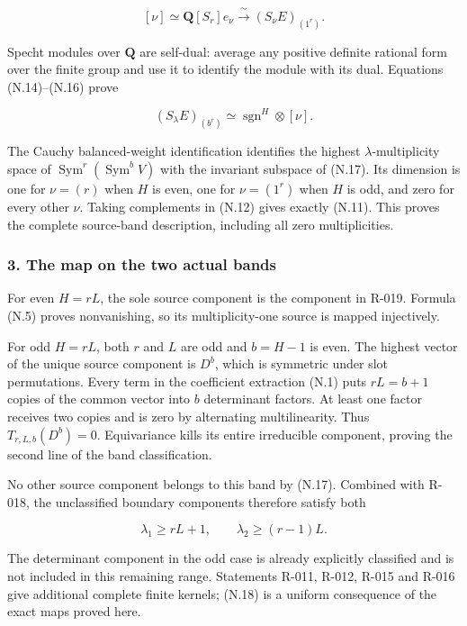 \documentclass[
  10pt,
]{article}
\begin{document}
\[
[\nu]\simeq\mathbf Q[S_r]e_\nu
\xrightarrow{\ \sim\ }(S_\nu E)_{(1^r)}.
\tag{N.16}
\]

Specht modules over \(\mathbf Q\) are self-dual: average any positive
definite rational form over the finite group and use it to identify the
module with its dual. Equations (N.14)--(N.16) prove

\[
(S_\lambda E)_{(b^r)}\simeq
\operatorname{sgn}^H\otimes[\nu].
\tag{N.17}
\]

The Cauchy balanced-weight identification identifies the highest
\(\lambda\)-multiplicity space of
\(\operatorname{Sym}^r(\operatorname{Sym}^bV)\) with the invariant
subspace of (N.17). Its dimension is one for \(\nu=(r)\) when \(H\) is
even, one for \(\nu=(1^r)\) when \(H\) is odd, and zero for every other
\(\nu\). Taking complements in (N.12) gives exactly (N.11). This proves
the complete source-band description, including all zero multiplicities.

\subsubsection{3. The map on the two actual
bands}\label{the-map-on-the-two-actual-bands}

For even \(H=rL\), the sole source component is the component in R-019.
Formula (N.5) proves nonvanishing, so its multiplicity-one source is
mapped injectively.

For odd \(H=rL\), both \(r\) and \(L\) are odd and \(b=H-1\) is even.
The highest vector of the unique source component is \(D^b\), which is
symmetric under slot permutations. Every term in the coefficient
extraction (N.1) puts \(rL=b+1\) copies of the common vector into \(b\)
determinant factors. At least one factor receives two copies and is zero
by alternating multilinearity. Thus \(T_{r,L,b}(D^b)=0\). Equivariance
kills its entire irreducible component, proving the second line of the
band classification.

No other source component belongs to this band by (N.17). Combined with
R-018, the unclassified boundary components therefore satisfy both

\[
\boxed{\lambda_1\ge rL+1,\qquad
       \lambda_2\ge(r-1)L.}
\tag{N.18}
\]

The determinant component in the odd case is already explicitly
classified and is not included in this remaining range. Statements
R-011, R-012, R-015 and R-016 give additional complete finite kernels;
(N.18) is a uniform consequence of the exact maps proved here.
\end{document}
